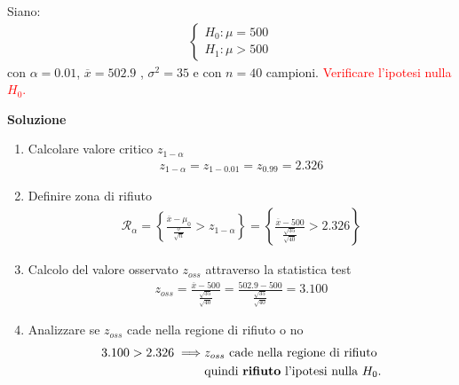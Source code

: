 \documentclass{article}  %
\theoremstyle{definition}
\begin{document}
\begin{esercizio}[Esercizio 1]
	Siano:
	\begin{align*}
		\begin{cases}
			H_0: \mu = 500 \\
			H_1: \mu > 500
		\end{cases}
	\end{align*}
	con $\alpha=0.01$, $\overline{x}=502.9$ , $\sigma^2=35$ e con $n=40$ campioni. \textcolor{red}{Verificare l'ipotesi nulla $H_0$.}
	\begin{center}
		\textbf{Soluzione}
	\end{center}
	\begin{enumerate}
		\item Calcolare valore critico $z_{1-\alpha}$
		      \begin{align*}
			      z_{1-\alpha}=z_{1-0.01}=z_{0.99}=2.326
		      \end{align*}
		\item Definire zona di rifiuto
		      \begin{align*}
			      \mathcal{R}_{\alpha}=\left\{\frac{\overline{x}-\mu_0}{\frac{\sigma}{\sqrt{n}}} > z_{1-\alpha}\right\}=\left\{\frac{\overline{x}-500}{\frac{\sqrt{35}}{\sqrt{40}}} > 2.326 \right\}
		      \end{align*}
		\item Calcolo del valore osservato $z_{oss}$ attraverso la statistica test
		      \begin{align*}
			      z_{oss}=\frac{\overline{x}-500}{\frac{\sqrt{35}}{\sqrt{40}}} = \frac{502.9-500}{\frac{\sqrt{35}}{\sqrt{40}}} = 3.100
		      \end{align*}
		\item Analizzare se $z_{oss}$ cade nella regione di rifiuto o no
		      \begin{align*}
			      3.100 > 2.326 \implies & z_{oss} \text{ cade nella regione di rifiuto} \\ &\text{quindi \textbf{rifiuto} l'ipotesi nulla } H_0.
		      \end{align*}
	\end{enumerate}
\end{esercizio}
\end{document}
